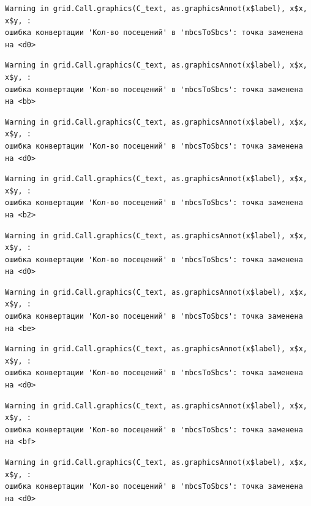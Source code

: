 \documentclass[
  letterpaper,
  DIV=11,
  numbers=noendperiod]{scrreprt}
\begin{document}
\begin{verbatim}
Warning in grid.Call.graphics(C_text, as.graphicsAnnot(x$label), x$x, x$y, :
ошибка конвертации 'Кол-во посещений' в 'mbcsToSbcs': точка заменена на <d0>
\end{verbatim}

\begin{verbatim}
Warning in grid.Call.graphics(C_text, as.graphicsAnnot(x$label), x$x, x$y, :
ошибка конвертации 'Кол-во посещений' в 'mbcsToSbcs': точка заменена на <bb>
\end{verbatim}

\begin{verbatim}
Warning in grid.Call.graphics(C_text, as.graphicsAnnot(x$label), x$x, x$y, :
ошибка конвертации 'Кол-во посещений' в 'mbcsToSbcs': точка заменена на <d0>
\end{verbatim}

\begin{verbatim}
Warning in grid.Call.graphics(C_text, as.graphicsAnnot(x$label), x$x, x$y, :
ошибка конвертации 'Кол-во посещений' в 'mbcsToSbcs': точка заменена на <b2>
\end{verbatim}

\begin{verbatim}
Warning in grid.Call.graphics(C_text, as.graphicsAnnot(x$label), x$x, x$y, :
ошибка конвертации 'Кол-во посещений' в 'mbcsToSbcs': точка заменена на <d0>
\end{verbatim}

\begin{verbatim}
Warning in grid.Call.graphics(C_text, as.graphicsAnnot(x$label), x$x, x$y, :
ошибка конвертации 'Кол-во посещений' в 'mbcsToSbcs': точка заменена на <be>
\end{verbatim}

\begin{verbatim}
Warning in grid.Call.graphics(C_text, as.graphicsAnnot(x$label), x$x, x$y, :
ошибка конвертации 'Кол-во посещений' в 'mbcsToSbcs': точка заменена на <d0>
\end{verbatim}

\begin{verbatim}
Warning in grid.Call.graphics(C_text, as.graphicsAnnot(x$label), x$x, x$y, :
ошибка конвертации 'Кол-во посещений' в 'mbcsToSbcs': точка заменена на <bf>
\end{verbatim}

\begin{verbatim}
Warning in grid.Call.graphics(C_text, as.graphicsAnnot(x$label), x$x, x$y, :
ошибка конвертации 'Кол-во посещений' в 'mbcsToSbcs': точка заменена на <d0>
\end{verbatim}
\end{document}
